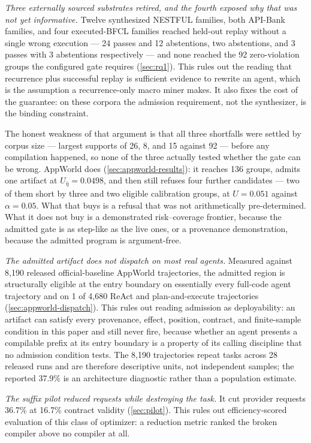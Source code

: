 \emph{Three externally sourced substrates retired, and the fourth exposed why that was
not yet informative.} Twelve synthesized NESTFUL families, both API-Bank families, and
four executed-BFCL families reached held-out replay without a single wrong execution ---
24 passes and 12 abstentions, two abstentions, and 3 passes with 3 abstentions
respectively --- and none reached the 92 zero-violation groups the configured gate requires
(\cref{sec:rq1}).  This rules out the reading that recurrence plus successful replay is
sufficient evidence to rewrite an agent, which is the assumption a recurrence-only macro
miner makes.  It also fixes the cost of the guarantee: on these corpora the admission
requirement, not the synthesizer, is the binding constraint.

The honest weakness of that argument is that all three shortfalls were settled by corpus
size --- largest supports of 26, 8, and 15 against 92 --- before any compilation happened, so
none of the three actually tested whether the gate can be wrong.  AppWorld does
(\cref{sec:appworld-results}): it reaches 136 groups, admits one artifact at
$U_{\hat\eta}=0.0498$, and then still refuses four further candidates --- two of them short
by three and two eligible calibration groups, at $U=0.051$ against $\alpha=0.05$.  What
that buys is a refusal that was not arithmetically pre-determined.  What it does not buy is
a demonstrated risk--coverage frontier, because the admitted gate is as step-like as the
live ones, or a provenance demonstration, because the admitted program is argument-free.

\emph{The admitted artifact does not dispatch on most real agents.} Measured against 8,190
released official-baseline AppWorld trajectories, the admitted region is structurally
eligible at the entry boundary on essentially every full-code agent trajectory and on 1 of
4,680 ReAct and plan-and-execute trajectories (\cref{sec:appworld-dispatch}).  This rules
out reading admission as deployability: an artifact can satisfy every provenance, effect,
position, contract, and finite-sample condition in this paper and still never fire, because
whether an agent presents a compilable prefix at its entry boundary is a property of its
calling discipline that no admission condition tests. The 8,190 trajectories repeat tasks
across 28 released runs and are therefore descriptive units, not independent samples; the
reported 37.9\% is an architecture diagnostic rather than a population estimate.

\emph{The suffix pilot reduced requests while destroying the task.} It cut provider
requests 36.7\% at 16.7\% contract validity (\cref{sec:pilot}).  This rules out
efficiency-scored evaluation of this class of optimizer: a reduction metric ranked the
broken compiler above no compiler at all.

